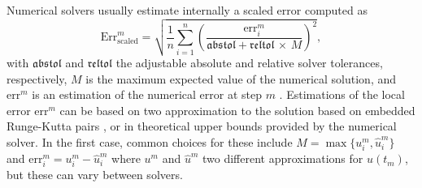 
Numerical solvers usually estimate internally a scaled error computed as 
\begin{equation}
    \text{Err}_\text{scaled}^{m}
    =
    \sqrt{
    \frac{1}{n} \sum_{i=1}^n \left( \frac{\text{err}_i^{m}}{\mathfrak{abstol} + \mathfrak{reltol} \, \times \, M} \right)^2 },
    \label{eq:internal-norm-wrong}
\end{equation}
with $\mathfrak{abstol}$ and $\mathfrak{reltol}$ the adjustable absolute and relative solver tolerances, respectively, $M$ is the maximum expected value of the numerical solution, and $\text{err}^m$ is an estimation of the numerical error at step $m$ \cite{hairer-solving-1, Rackauckas_Nie_2016}. 
Estimations of the local error $\text{err}^{m}$ can be based on two approximation to the solution based on embedded Runge-Kutta pairs \cite{Ranocha_Dalcin_Parsani_Ketcheson_2022, hairer-solving-1}, or in theoretical upper bounds provided by the numerical solver. 
In the first case, common choices for these include $M = \max \{ u_i^{m}, \hat u_i^{m} \}$ and $\text{err}_i^{m} = u_i^{m} - \hat u_i^{m}$ where $u^m$ and $\hat u^m$ two different approximations for $u(t_m)$, but these can vary between solvers. 

